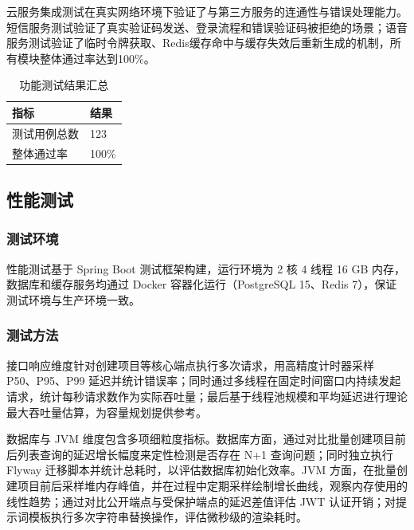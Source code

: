 \par 云服务集成测试在真实网络环境下验证了与第三方服务的连通性与错误处理能力。短信服务测试验证了真实验证码发送、登录流程和错误验证码被拒绝的场景；语音服务测试验证了临时令牌获取、Redis缓存命中与缓存失效后重新生成的机制，所有模块整体通过率达到100\%。

\begin{table}[htbp]
  \centering
  \caption{功能测试结果汇总}
  \label{tab:func-test-result}
  \begin{tabular}{p{4cm}p{4cm}}
    \hline
    指标 & 结果 \\
    \hline
    测试用例总数 & 123 \\
    整体通过率 & 100\% \\
    \hline
  \end{tabular}
\end{table}

\subsection{性能测试}

\subsubsection{测试环境}

\par 性能测试基于 Spring Boot 测试框架构建，运行环境为 2 核 4 线程 16 GB 内存，数据库和缓存服务均通过 Docker 容器化运行（PostgreSQL 15、Redis 7），保证测试环境与生产环境一致。

\subsubsection{测试方法}

\par 接口响应维度针对创建项目等核心端点执行多次请求，用高精度计时器采样 P50、P95、P99 延迟并统计错误率；同时通过多线程在固定时间窗口内持续发起请求，统计每秒请求数作为实际吞吐量；最后基于线程池规模和平均延迟进行理论最大吞吐量估算，为容量规划提供参考。

\par 数据库与 JVM 维度包含多项细粒度指标。数据库方面，通过对比批量创建项目前后列表查询的延迟增长幅度来定性检测是否存在 N+1 查询问题；同时独立执行 Flyway 迁移脚本并统计总耗时，以评估数据库初始化效率。JVM 方面，在批量创建项目前后采样堆内存峰值，并在过程中定期采样绘制增长曲线，观察内存使用的线性趋势；通过对比公开端点与受保护端点的延迟差值评估 JWT 认证开销；对提示词模板执行多次字符串替换操作，评估微秒级的渲染耗时。

